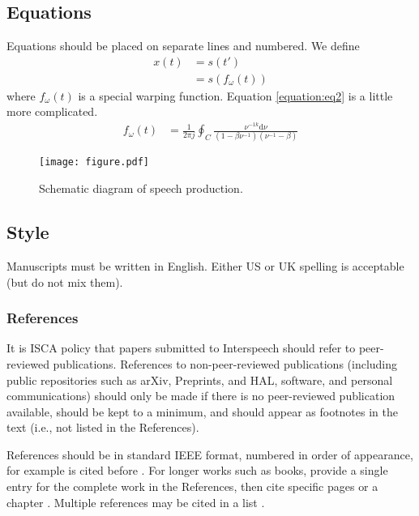 \documentclass{Interspeech2024}
\begin{document}
\subsection{Equations}

Equations should be placed on separate lines and numbered. We define
% 
\begin{align}
  x(t) &= s(t') \nonumber \\ 
       &= s(f_\omega(t))
\end{align}
% 
where \(f_\omega(t)\) is a special warping function. Equation \ref{equation:eq2} is a little more complicated.
% 
\begin{align}
  f_\omega(t) &= \frac{1}{2 \pi j} \oint_C 
  \frac{\nu^{-1k} \mathrm{d} \nu}
  {(1-\beta\nu^{-1})(\nu^{-1}-\beta)}
  \label{equation:eq2}
\end{align}
% 



\begin{figure}[t]
  \centering
  \texttt{[image: figure.pdf]}
  \caption{Schematic diagram of speech production.}
  \label{fig:speech_production}
\end{figure}


\subsection{Style}

Manuscripts must be written in English. Either US or UK spelling is acceptable (but do not mix them).

\subsubsection{References}
\label{section:references}

It is ISCA policy that papers submitted to Interspeech should refer to peer-reviewed publications. References to non-peer-reviewed publications (including public repositories such as arXiv, Preprints, and HAL, software, and personal communications) should only be made if there is no peer-reviewed publication available, should be kept to a minimum, and should appear as footnotes in the text (i.e., not listed in the References). 

References should be in standard IEEE format, numbered in order of appearance, for example \cite{Davis80-COP} is cited before \cite{Rabiner89-ATO}. For longer works such as books, provide a single entry for the complete work in the References, then cite specific pages \cite[pp.\ 417--422]{Hastie09-TEO} or a chapter \cite[Chapter 2]{Hastie09-TEO}. Multiple references may be cited in a list \cite{Smith22-XXX, Jones22-XXX}.
\end{document}
